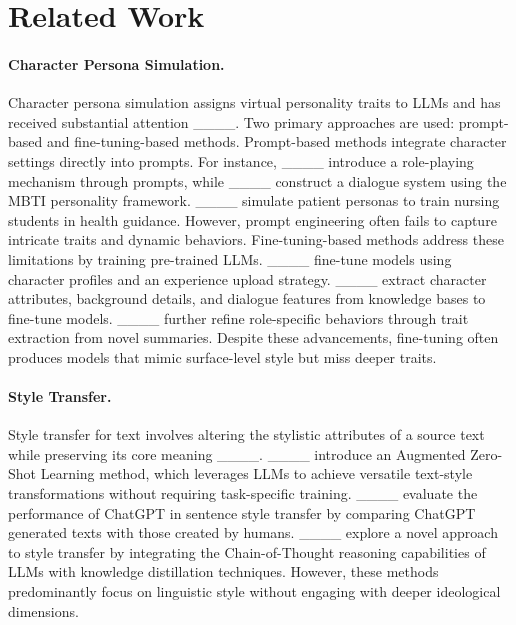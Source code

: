 \section{Related Work}
\paragraph{Character Persona Simulation.}
Character persona simulation assigns virtual personality traits to LLMs and has received substantial attention ____. Two primary approaches are used: prompt-based and fine-tuning-based methods.
Prompt-based methods integrate character settings directly into prompts. For instance, ____ introduce a role-playing mechanism through prompts, while ____ construct a dialogue system using the MBTI personality framework. ____ simulate patient personas to train nursing students in health guidance. However, prompt engineering often fails to capture intricate traits and dynamic behaviors.
Fine-tuning-based methods address these limitations by training pre-trained LLMs. ____ fine-tune models using character profiles and an experience upload strategy. ____ extract character attributes, background details, and dialogue features from knowledge bases to fine-tune models. 
____ further refine role-specific behaviors through trait extraction from novel summaries. Despite these advancements, fine-tuning often produces models that mimic surface-level style but miss deeper traits.

\paragraph{Style Transfer.}  
Style transfer for text involves altering the stylistic attributes of a source text while preserving its core meaning ____.
____ introduce an Augmented Zero-Shot Learning method, which leverages LLMs to achieve versatile text-style transformations without requiring task-specific training.
____ evaluate the performance of ChatGPT in sentence style transfer by comparing ChatGPT generated texts with those created by humans.
____ explore a novel approach to style transfer by integrating the Chain-of-Thought reasoning capabilities of LLMs with knowledge distillation techniques.
However, these methods predominantly focus on linguistic style without engaging with deeper ideological dimensions.

